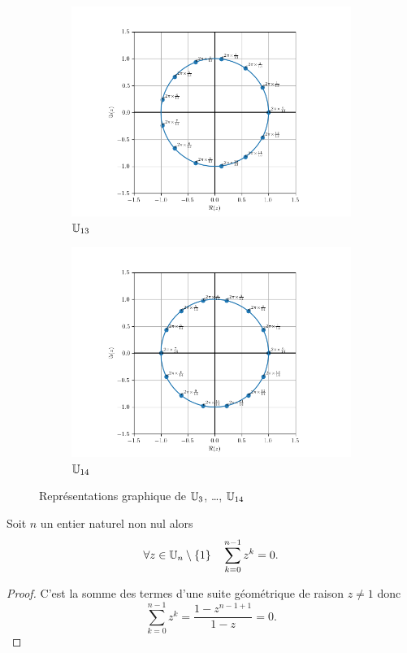\begin{figure}
\begin{subfigure}{.3\textwidth}
      \includegraphics[scale=.33]{U_13.png}  
      \caption{$\mathbb{U}_{13}$}
      \label{fig:U13}      
    \end{subfigure}
    \begin{subfigure}{.3\textwidth}
      \centering
      \includegraphics[scale=.33]{U_14.png}  
      \caption{$\mathbb{U}_{14}$}
      \label{fig:U14}
    \end{subfigure}
 \caption{Représentations graphique de $\mathbb{U}_3$, \ldots, $\mathbb{U}_{14}$}
  \label{fig:racinesnieme}
\end{figure}

\begin{theo}
  Soit \(n\) un entier naturel non nul alors
  \begin{equation}
    \forall z \in \mathbb{U}_n \setminus \{1\} \quad \sum_{k=0}^{n-1} z^k = 0.
  \end{equation}
\end{theo}
\begin{proof}
  C'est la somme des termes d'une suite géométrique de raison \(z \neq 1\) donc
  \begin{equation}
    \sum_{k=0}^{n-1} z^k = \frac{1-z^{n-1+1}}{1-z} = 0.
  \end{equation}
\end{proof}

